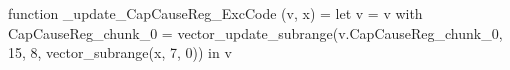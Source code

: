 function _update_CapCauseReg_ExcCode (v, x) = let v = { v with CapCauseReg_chunk_0 = vector_update_subrange(v.CapCauseReg_chunk_0, 15, 8, vector_subrange(x, 7, 0)) } in v
